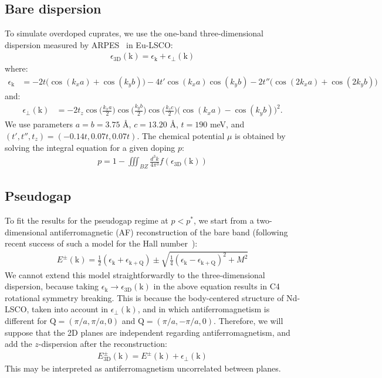 \documentclass[notitlepage,11pt,nofootinbib]{revtex4-1}
\renewcommand{\vec}[1]{\bm{\mathrm{#1}}}
\begin{document}
\subsection{Bare dispersion}
To simulate overdoped cuprates, we use the one-band three-dimensional dispersion measured by ARPES~\cite{horio_three-dimensional_2018} in Eu-LSCO:
\begin{align}
\epsilon_{\text{3D}}(\vec k)=\epsilon_{\vec k}+\epsilon_{\perp}(\vec k)
\end{align}
where:
\begin{align}
\epsilon_{\vec k} 
&= 
-2t\big(\cos (k_xa) + \cos (k_yb)\big)
-4t'\cos (k_xa)\cos (k_yb)
-2t''\big(\cos (2k_xa)+\cos (2k_yb)\big)
\end{align}
and:
\begin{align}
\epsilon_{\perp}(\vec k)
&=
-2t_z\cos\Big(\frac{k_xa}{2}\Big)
\cos\Big(\frac{k_yb}{2}\Big)
\cos\Big(\frac{k_zc}{2}\Big)
\big(\cos (k_xa) - \cos (k_yb)\big)^2.
\end{align}
We use parameters $a=b=3.75$ {\AA}, $c=13.20$ {\AA}, $t=190$ meV, and $(t',t'',t_z)=(-0.14t,0.07t,0.07t)$. The chemical potential $\mu$ is obtained by solving the integral equation for a given doping $p$:
\begin{align}
p = 1 - \iiint_{BZ} \frac{d^{3}k}{4\pi^{3}} f(\epsilon_{\text{3D}}(\vec k))
\end{align}

\subsection{Pseudogap} 
To fit the results for the pseudogap regime at $p<p^*$, we start from a two-dimensional antiferromagnetic (AF) reconstruction of the bare band (following recent success of such a model for the Hall number~\cite{storey_hall_2016,verret_phenomenological_2017}):
\begin{align}
E^{\pm}(\vec k) 
= 
\tfrac{1}{2}(\epsilon_{\vec k}+\epsilon_{\vec k+\vec Q})
\pm \sqrt{
\tfrac{1}{4}(\epsilon_{\vec k}-\epsilon_{\vec k+\vec Q})^2 + M^2}
\end{align}
We cannot extend this model straightforwardly to the three-dimensional dispersion, because taking $\epsilon_{\vec k}\rightarrow\epsilon_{\text{3D}}(\vec k)$ in the above equation results in C4 rotational symmetry breaking. This is because the body-centered structure of Nd-LSCO, taken into account in $\epsilon_\perp(\vec k)$, and in which antiferromagnetism is different for $\vec Q=(\pi/a,\pi/a,0)$ and $\vec Q=(\pi/a,-\pi/a,0)$. Therefore, we will suppose that the 2D planes are independent regarding antiferromagnetism, and add the $z$-dispersion after the reconstruction:  
\begin{align}
E^{\pm}_{\text{3D}}(\vec k)=E^{\pm}(\vec k)+\epsilon_{\perp}(\vec k)
\end{align}
This may be interpreted as antiferromagnetism uncorrelated between planes.
\end{document}
